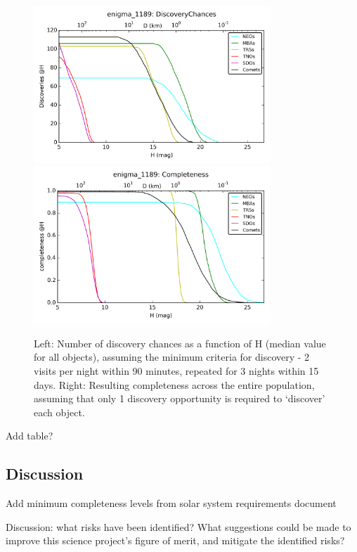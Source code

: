 \begin{figure}
\includegraphics[width=3.5in]{figs/solarsystem/discoverychances}
\includegraphics[width=3.5in]{figs/solarsystem/completeness}
\caption{Left: Number of discovery chances as a function of H
  (median value for all objects), assuming the minimum criteria for
  discovery - 2 visits per night within 90 minutes, repeated for 3
  nights within 15 days. Right: Resulting completeness across the
  entire population, assuming that only 1 discovery opportunity is
  required to `discover' each object. 
\label{standard_discovery}}
\end{figure}

Add table?



\subsection{Discussion}
\label{sec:\secname:discussion}

Add minimum completeness levels from solar system requirements
document



Discussion: what risks have been identified? What suggestions could be
made to improve this science project's figure of merit, and mitigate
the identified risks?



